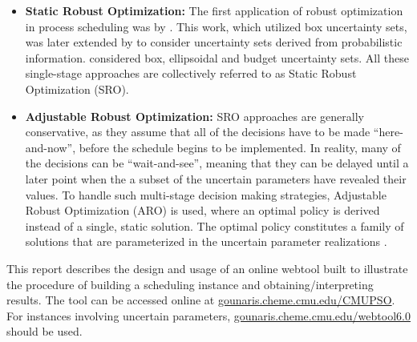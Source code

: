 \begin{itemize}
\item \textbf{Static Robust Optimization: } The first application of robust optimization in process scheduling was by \cite{LIN20041069}. This work, which utilized box uncertainty sets, was later extended by \cite{JANAK2007171} to consider uncertainty sets derived from probabilistic information. \cite{LiIerapetritou} considered box, ellipsoidal and budget uncertainty sets. All these single-stage approaches are collectively referred to as Static Robust Optimization (SRO).

\item \textbf{Adjustable Robust Optimization: } SRO approaches are generally conservative, as they assume that all of the decisions have to be made 	``here-and-now'', before the schedule begins to be implemented. In reality, many of the decisions can be ``wait-and-see'', meaning that they can be delayed until a later point when the a subset of the uncertain parameters have revealed their values. To handle such multi-stage decision making strategies, Adjustable Robust Optimization (ARO) is used, where an optimal policy is derived instead of a single, static solution. The optimal policy constitutes a family of solutions that are parameterized in the uncertain parameter realizations \citep{lappas}.

\end{itemize}


This report describes the design and usage of an online webtool built to illustrate the procedure of building a scheduling instance and obtaining/interpreting results. The tool can be accessed online at \url{gounaris.cheme.cmu.edu/CMUPSO}. For instances involving uncertain parameters, \url{gounaris.cheme.cmu.edu/webtool6.0} should be used.